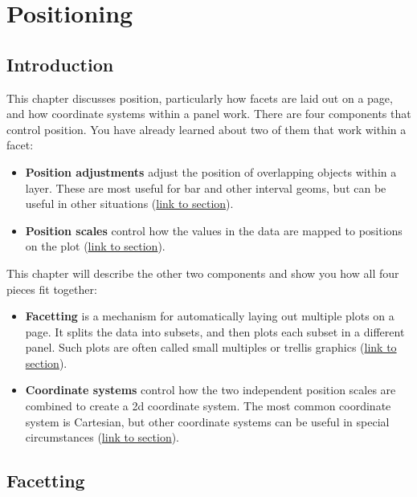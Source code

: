 \hypertarget{cha:position}{%
\chapter{Positioning}\label{cha:position}}

\hypertarget{introduction}{%
\section{Introduction}\label{introduction}}

This chapter discusses position, particularly how facets are laid out on
a page, and how coordinate systems within a panel work. There are four
components that control position. You have already learned about two of
them that work within a facet: 

\begin{itemize}
\item
  \textbf{Position adjustments} adjust the position of overlapping
  objects within a layer. These are most useful for bar and other
  interval geoms, but can be useful in other situations
  (\protect\hyperlink{sec:position}{link to section}).
\item
  \textbf{Position scales} control how the values in the data are mapped
  to positions on the plot (\protect\hyperlink{sub:scale-position}{link
  to section}).
\end{itemize}

This chapter will describe the other two components and show you how all
four pieces fit together:

\begin{itemize}
\item
  \textbf{Facetting} is a mechanism for automatically laying out
  multiple plots on a page. It splits the data into subsets, and then
  plots each subset in a different panel. Such plots are often called
  small multiples or trellis graphics
  (\protect\hyperlink{sec:facetting}{link to section}).
\item
  \textbf{Coordinate systems} control how the two independent position
  scales are combined to create a 2d coordinate system. The most common
  coordinate system is Cartesian, but other coordinate systems can be
  useful in special circumstances (\protect\hyperlink{sec:coord}{link to
  section}).
\end{itemize}

\hypertarget{sec:facetting}{%
\section{Facetting}\label{sec:facetting}}

